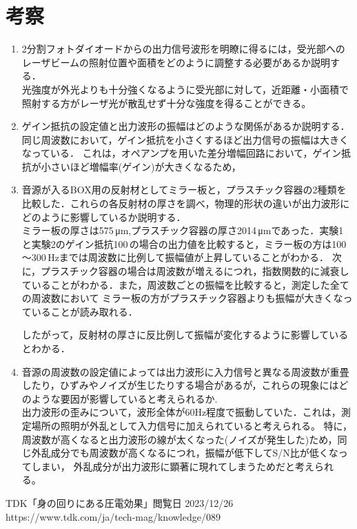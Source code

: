 \documentclass{ltjsarticle}
\begin{document}
\section{考察}
	\begin{enumerate}
		\item 2分割フォトダイオードからの出力信号波形を明瞭に得るには，受光部へのレーザビームの照射位置や面積をどのように調整する必要があるか説明する．\\
			光強度が外光よりも十分強くなるように受光部に対して，近距離・小面積で照射する方がレーザ光が散乱せず十分な強度を得ることができる。
		\item ゲイン抵抗の設定値と出力波形の振幅はどのような関係があるか説明する．\\
			同じ周波数において，ゲイン抵抗を小さくするほど出力信号の振幅は大きくなっている．
			これは，オペアンプを用いた差分増幅回路において，ゲイン抵抗が小さいほど増幅率(ゲイン)が大きくなるため，
		\item 音源が入るBOX用の反射材としてミラー板と，プラスチック容器の2種類を比較した．これらの各反射材の厚さを調べ，物理的形状の違いが出力波形にどのように影響しているか説明する．\\
			ミラー板の厚さは575\,μm,プラスチック容器の厚さ2014\,μmであった．実験1と実験2のゲイン抵抗100\,\Omega の場合の出力値を比較すると，ミラー板の方は100～300\,Hzまでは周波数に比例して振幅値が上昇していることがわかる．
			次に，プラスチック容器の場合は周波数が増えるにつれ，指数関数的に減衰していることがわかる．また，周波数ごとの振幅を比較すると，測定した全ての周波数において
			ミラー板の方がプラスチック容器よりも振幅が大きくなっていることが読み取れる．

			したがって，反射材の厚さに反比例して振幅が変化するように影響しているとわかる．
		\item 音源の周波数の設定値によっては出力波形に入力信号と異なる周波数が重畳したり，ひずみやノイズが生じたりする場合があるが，これらの現象にはどのような要因が影響していると考えられるか.\\
			出力波形の歪みについて，波形全体が60Hz程度で振動していた．これは，測定場所の照明が外乱として入力信号に加えられていると考えられる。
			特に，周波数が高くなると出力波形の線が太くなった(ノイズが発生した)ため，同じ外乱成分でも周波数が高くなるにつれ，振幅が低下してS/N比が低くなってしまい，
			外乱成分が出力波形に顕著に現れてしまうためだと考えられる。
	\end{enumerate}
\begin{thebibliography}{99}
	TDK「身の回りにある圧電効果」閲覧日 2023/12/26\\
	https://www.tdk.com/ja/tech-mag/knowledge/089
\end{thebibliography}
\end{document}
